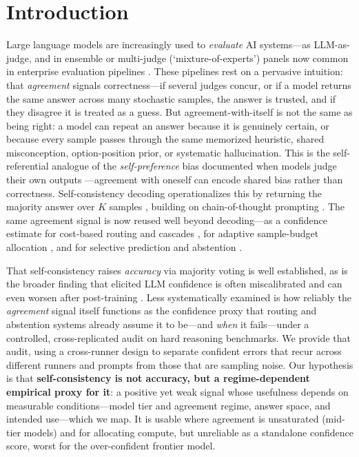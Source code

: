 \documentclass[11pt]{article}
\begin{document}
\section{Introduction}
\label{sec:intro}
Large language models are increasingly used to \emph{evaluate} AI systems---as
LLM-as-judge, and in ensemble or multi-judge (`mixture-of-experts') panels now common in
enterprise evaluation pipelines \citep{zheng2023judging}. These pipelines rest on a
pervasive intuition: that \emph{agreement} signals correctness---if several judges concur,
or if a model returns the same answer across many stochastic samples, the answer is trusted,
and if they disagree it is treated as a guess. But agreement-with-itself is not the same as being
right: a model can repeat an answer because it is genuinely certain, or because every sample passes
through the same memorized heuristic, shared misconception, option-position prior, or systematic
hallucination. This is the self-referential analogue of the \emph{self-preference} bias documented when
models judge their own outputs \citep{zheng2023judging,panickssery2024llmevaluators}---agreement with
oneself can encode shared bias rather than correctness. Self-consistency decoding operationalizes
this by returning the majority answer over $K$ samples \citep{wang2023selfconsistency},
building on chain-of-thought prompting \citep{wei2022cot}. The same agreement signal
is now reused well beyond decoding---as a confidence estimate for cost-based routing
and cascades \citep{chen2023frugalgpt}, for adaptive sample-budget allocation
\citep{aggarwal2023adaptive}, and for selective prediction and abstention
\citep{geifman2017selective,kamath2020selective}.

That self-consistency raises \emph{accuracy} via majority voting is well established,
as is the broader finding that elicited LLM confidence is often miscalibrated and can
even worsen after post-training \citep{kadavath2022know,lin2022teaching,tian2023justask,openai2023gpt4}.
Less systematically examined is how reliably the \emph{agreement} signal itself functions as the
confidence proxy that routing and abstention systems already assume it to be---and \emph{when} it
fails---under a controlled, cross-replicated audit on hard
reasoning benchmarks. We provide that audit, using a cross-runner design to
separate confident errors that recur across different runners and prompts from those that are sampling noise.
Our hypothesis is that \textbf{self-consistency is not accuracy, but a regime-dependent empirical proxy for
it}: a positive yet weak signal whose usefulness depends on measurable conditions---model tier and
agreement regime, answer space, and intended use---which we map. It is usable where agreement is
unsaturated (mid-tier models) and for allocating compute, but unreliable as a standalone confidence score,
worst for the over-confident frontier model.
\end{document}
